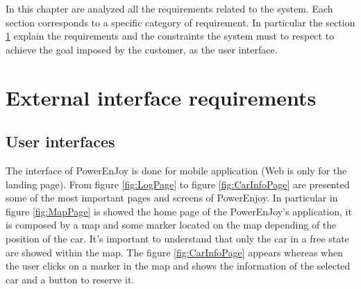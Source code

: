 In this chapter are analyzed all the requirements related to the system. Each section corresponds to a specific category of requirement. In particular the section \ref{sec:ExternalInterface} explain the requirements and the constraints the system must to respect to achieve the goal imposed by the customer, as the user interface.
\section{External interface requirements}\label{sec:ExternalInterface}
\subsection{User interfaces}
The interface of PowerEnJoy is done for mobile application (Web is only for the landing page). From figure \ref{fig:LogPage} to figure \ref{fig:CarInfoPage} are presented some of the most important pages and screens of PowerEnjoy. In particular in figure \ref{fig:MapPage} is showed the home page of the PowerEnJoy's application, it is composed by a map and some marker located on the map depending of the position of the car. It's important to understand that only the car in a free state are showed within the map. The figure \ref{fig:CarInfoPage} appears whereas when the user clicks on a marker in the map and shows the information of the selected car and a button to reserve it.
\begin{itemize}
\end{itemize}
\newpage
